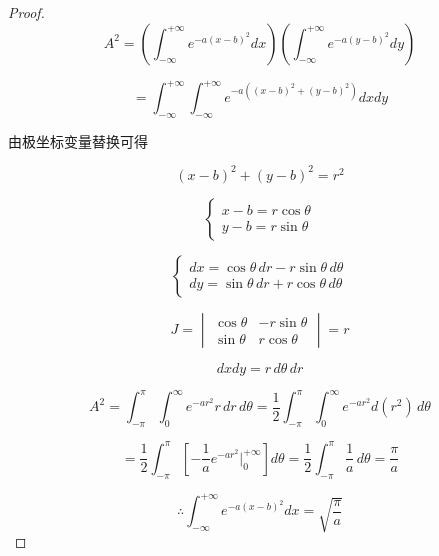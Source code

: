 \documentclass[12pt,a4paper]{article}
\numberwithin{subsection}{section}
\numberwithin{subsubsection}{subsection}
\theoremstyle{plain}
\theoremstyle{definition}
\theoremstyle{remark}
\begin{document}
	
	\begin{proof}
		\begin{equation*}
			A^2 = \left( \int_{-\infty}^{+\infty} e^{-a(x-b)^2} dx \right) \left( \int_{-\infty}^{+\infty} e^{-a(y-b)^2} dy \right)
		\end{equation*}
		
		\begin{equation*}
			= \int_{-\infty}^{+\infty} \int_{-\infty}^{+\infty} e^{-a((x-b)^2 + (y-b)^2)} dx dy
		\end{equation*}
		
		由极坐标变量替换可得
		
		\begin{equation*}
			(x - b)^2 + (y - b)^2 = r^2
		\end{equation*}
		
		\begin{equation*}
			\begin{cases}
				x - b = r \cos\theta \\
				y - b = r \sin\theta
			\end{cases}
		\end{equation*}
		
		\begin{equation*}
			\begin{cases}
				dx = \cos\theta \, dr - r \sin\theta \, d\theta \\
				dy = \sin\theta \, dr + r \cos\theta \, d\theta
			\end{cases}
		\end{equation*}
		
		\begin{equation*}
			J = \begin{vmatrix}
				\cos\theta & -r \sin\theta \\
				\sin\theta & r \cos\theta
			\end{vmatrix} = r
		\end{equation*}
		
		\begin{equation*}
			dx dy = r \, d\theta \, dr
		\end{equation*}
		
		\begin{equation*}
			A^2 = \int_{-\pi}^{\pi} \int_{0}^{\infty} e^{-ar^2} r \, dr \, d\theta	= \frac{1}{2} \int_{-\pi}^{\pi} \int_{0}^{\infty} e^{-ar^2} d(r^2) \, d\theta
		\end{equation*}
		
		
		\begin{equation*}
			= \frac{1}{2} \int_{-\pi}^{\pi} \left[ -\frac{1}{a} e^{-ar^2} \Big|_{0}^{+\infty} \right] d\theta= \frac{1}{2} \int_{-\pi}^{\pi} \frac{1}{a} \, d\theta	= \frac{\pi}{a}
		\end{equation*}
		
		
		\begin{equation*}
			\therefore	\int_{-\infty}^{+\infty} e^{-a(x-b)^2} dx = \sqrt{\frac{\pi}{a}}
		\end{equation*}
		
	\end{proof}
	
\end{document}

